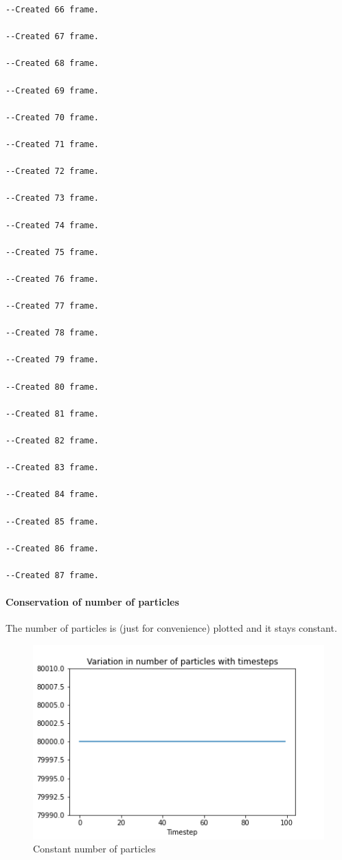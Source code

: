 \documentclass[
]{article}
\begin{document}
\begin{verbatim}
--Created 66 frame.

--Created 67 frame.

--Created 68 frame.

--Created 69 frame.

--Created 70 frame.

--Created 71 frame.

--Created 72 frame.

--Created 73 frame.

--Created 74 frame.

--Created 75 frame.

--Created 76 frame.

--Created 77 frame.

--Created 78 frame.

--Created 79 frame.

--Created 80 frame.

--Created 81 frame.

--Created 82 frame.

--Created 83 frame.

--Created 84 frame.

--Created 85 frame.

--Created 86 frame.

--Created 87 frame.
\end{verbatim}

\hypertarget{conservation-of-number-of-particles}{%
\paragraph{Conservation of number of
particles}\label{conservation-of-number-of-particles}}

The number of particles is (just for convenience) plotted and it stays
constant.

\begin{figure}
\centering
\includegraphics{Assets/number_particles.png}
\caption{Constant number of particles}
\end{figure}
\end{document}
